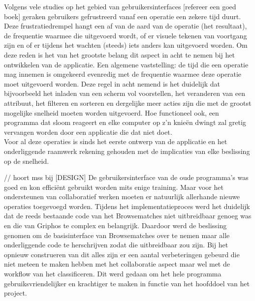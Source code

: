Volgens vele studies op het gebied van gebruikersinterfaces [refereer een goed boek] geraken gebruikers gefrustreerd vanaf een operatie een zekere tijd duurt. Deze frustratiedrempel hangt een af van de aard van de operatie (het resultaat), de frequentie waarmee die uitgevoerd wordt, of er visuele tekenen van voortgang zijn en of er tijdens het wachten (steeds) iets anders kan uitgevoerd worden. Om deze reden is het van het grootste belang dit aspect in acht te nemen bij het ontwikkelen van de applicatie. Een algemene vaststelling: de tijd die een operatie mag innemen is omgekeerd evenredig met de frequentie waarmee deze operatie moet uitgevoerd worden. Deze regel in acht nemend is het duidelijk dat bijvoorbeeld het inladen van een scherm vol voorstellen, het veranderen van een attribuut, het filteren en sorteren en dergelijke meer acties zijn die met de grootst mogelijke snelheid moeten worden uitgevoerd. Hoe functioneel ook, een programma dat sloom reageert en elke computer op z'n knie\"en dwingt zal gretig vervangen worden door een applicatie die dat niet doet.\\

Voor al deze operaties is sinds het eerste ontwerp van de applicatie en het onderliggende raamwerk rekening gehouden met de implicaties van elke beslissing op de snelheid.

// hoort mss bij [DESIGN]
De gebruikersinterface van de oude programma's was goed en kon effici\"ent gebruikt worden mits enige training. Maar voor het ondersteunen van collaboratief werken moeten er natuurlijk allerhande nieuwe operaties toegevoegd
worden. Tijdens het implementatieproces werd het duidelijk dat de reeds bestaande code van het Browsematches niet uitbreidbaar genoeg was en die van Griphos te complex en belangrijk. Daardoor werd de beslissing genomen om de
basisinterface van Browsematches over te nemen maar alle onderliggende code te herschrijven zodat die uitbreidbaar zou zijn. Bij het opnieuw construeren van dit alles zijn er een aantal verbeteringen gebeurd die niet meteen te maken hebben met het collaboratie aspect maar wel met de workflow van het classificeren. Dit werd gedaan om het hele programma gebruiksvriendelijker en krachtiger te maken in functie van het hoofddoel van het project.

